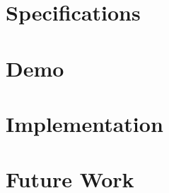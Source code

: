 \documentclass{beamer}
\begin{document}
\section{Specifications}
\begin{frame}
 
\end{frame}

\section{Demo}
\begin{frame}
 
\end{frame}

\section{Implementation}
\begin{frame}
 
\end{frame}

\section{Future Work}
\begin{frame}
 
\end{frame}
\end{document}
